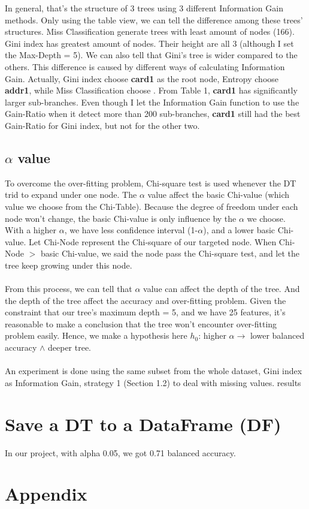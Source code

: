 \documentclass{article}
\begin{document}
In general, that's the structure of 3 trees using 3 different Information Gain methods. Only using the table view, we can tell the difference among these trees' structures. Miss Classification generate trees with least amount of nodes (166). Gini index has greatest amount of nodes. Their height are all 3 (although I set the Max-Depth = 5). We can also tell that Gini's tree is wider compared to the others. This difference is caused by different ways of calculating Information Gain. Actually, Gini index choose \textbf{card1} as the root node, Entropy choose \textbf{addr1}, while Miss Classification choose . From Table 1, \textbf{card1} has significantly larger sub-branches. Even though I let the Information Gain function to use the Gain-Ratio when it detect more than 200 sub-branches, \textbf{card1} still had the best Gain-Ratio for Gini index, but not for the other two. 



\subsection{$\alpha$ value}

To overcome the over-fitting problem, Chi-square test is used whenever the DT trid to expand under one node. The $\alpha$ value affect the basic Chi-value (which value we choose from the Chi-Table). Because the degree of freedom under each node won't change, the basic Chi-value is only influence by the $\alpha$ we choose. With a higher $\alpha$, we have less confidence interval (1-$\alpha$), and a lower basic Chi-value. Let Chi-Node represent the Chi-square of our targeted node. When Chi-Node $>$ basic Chi-value, we said the node pass the Chi-square test, and let the tree keep growing under this node.\\\\
From this process, we can tell that $\alpha$ value can affect the depth of the tree. And the depth of the tree affect the accuracy and over-fitting problem. Given the constraint that our tree's maximum depth = 5, and we have 25 features, it's reasonable to make a conclusion that the tree won't encounter over-fitting problem easily. Hence, we make a hypothesis here $h_0$: higher $\alpha \rightarrow$ lower balanced accuracy $\land$ deeper tree.\\\\
An experiment is done using the same subset from the whole dataset, Gini index as Information Gain, strategy 1  (Section 1.2) to deal with missing values. results 



\section{Save a DT to a DataFrame (DF)}



In our project, with alpha 0.05, we got 0.71 balanced accuracy. 



\section{Appendix}
\end{document}
